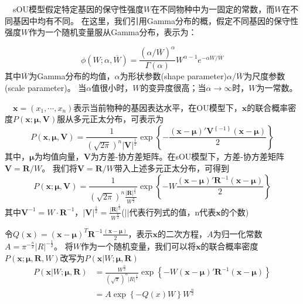 \documentclass[hyperref,]{ctexart}
\begin{document}
 sOU模型假定特定基因的保守性强度\(W\)在不同物种中为一固定的常数，而\(W\)在不同基因中均有不同。
在这里，我们引用Gamma分布的概，假定不同基因的保守性强度\(W\)作为一个随机变量服从Gamma分布，表示为：

\[\phi\left(W;\alpha,\overline{W}\right)=\frac{(\alpha/\overline{W})^\alpha}{\Gamma\left(\alpha\right)}W^{\alpha-1}e^{-\alpha W/\overline{W}}\]
其中\(\overline{W}\)为Gamma分布的均值，\(\alpha\)为形状参数(shape
parameter)\(\alpha/\overline{W}\)为尺度参数(scale parameter)。
当\(\alpha\)值很小时，\(W\)的变异度很高；当\(\alpha\rightarrow\infty\)时，\(W\)为一常数。

 \(\boldsymbol{x}=(x_1,\cdots,x_n)\)表示当前物种的基因表达水平，在OU模型下，\(\boldsymbol{x}\)的联合概率密度\(P(\boldsymbol{x;\mu,V})\)服从多元正太分布，可表示为
\[P\left(\boldsymbol{x,\mu,V}\right)=\frac{1}{\left(\sqrt{2\pi}\right)^n\left|\boldsymbol{V}\right|^{\frac{1}{2}}}\exp\left\{-\frac{\left(\boldsymbol{x}-\boldsymbol{\mu}\right)'\boldsymbol{V}^{\left\{-1\right\}}\left(\boldsymbol{x}-\boldsymbol{\mu}\right)}{2}\right\}\]
其中，\(\boldsymbol{\mu}\)为均值向量，\(\boldsymbol{V}\)为方差-协方差矩阵。在sOU模型下，方差-协方差矩阵\(\boldsymbol{V}=\boldsymbol{R}/W\)。
我们将\(\boldsymbol{V}=\boldsymbol{R}/W\)带入上述多元正太分布，可得到
\[P\left(\boldsymbol{x};\boldsymbol{\mu},\boldsymbol{V}\right)=\frac{1}{\left(\sqrt{2\pi}\right)^n\frac{\left|\boldsymbol{R}\right|^{\frac{1}{2}}}{W^{\frac{n}{2}}}}\exp\left\{-W\frac{\left(\boldsymbol{x}-\boldsymbol{\mu}\right)'\boldsymbol{R}^{-1}\left(\boldsymbol{x}-\boldsymbol{\mu}\right)}{2}\right\}\]
其中\(\boldsymbol{V}^{-1}=W\cdot \boldsymbol{R}^{-1}\)，\(\left|\boldsymbol{V}\right|^{\frac{1}{2}}=\frac{\left|\boldsymbol{R}\right|^{\frac{1}{2}}}{W^{\frac{n}{2}}}\)(\(\left|\right|\)代表行列式的值，n代表\(\boldsymbol{x}\)的个数)

令\(Q(\boldsymbol{x})=(\boldsymbol{x}-\boldsymbol{\mu})^T\boldsymbol{R}^{-1}\frac{(\boldsymbol{x}-\boldsymbol{\mu})}{2}\)，表示\(\boldsymbol{x}\)的二次方程，\(A\)为归一化常数\(A=\pi^{-\frac{n}{2}}\left|R\right|^{-\frac{1}{2}}\)。
将\(W\)作为一个随机变量，我们可以将\(\boldsymbol{x}\)的联合概率密度\(P(\boldsymbol{x};\boldsymbol{\mu},\boldsymbol{R},W)\)改写为\(P(\boldsymbol{x}|W;\boldsymbol{\mu,R})\)
\begin{align*}P\left(\boldsymbol{x}|W;\boldsymbol{\mu,R}\right)&=\frac{W^{\frac{n}{2}}}{\left(\sqrt{\pi}\right)^n\left|R\right|^{\frac{1}{2}}}\exp\left\{-W\left(\boldsymbol{x}-\boldsymbol{\mu}\right)'\boldsymbol{R}^{-1}\left(\boldsymbol{x}-\boldsymbol{\mu}\right)\right\}\\
&=A\exp\left\{-Q\left(x\right)W\right\}W^{\frac{n}{2}}
\end{align*}
\end{document}
